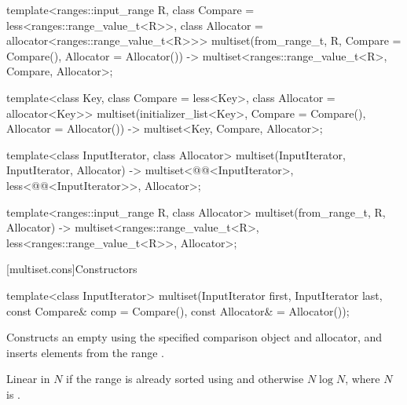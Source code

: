 \documentclass{wg21}
\begin{document}
\begin{addedblock}
\begin{codeblock}
template<ranges::input_range R, class Compare = less<ranges::range_value_t<R>>,
    class Allocator = allocator<ranges::range_value_t<R>>>
multiset(from_range_t, R, Compare = Compare(), Allocator = Allocator())
-> multiset<ranges::range_value_t<R>,  Compare, Allocator>;
\end{codeblock}
\end{addedblock}
\begin{codeblock}

template<class Key, class Compare = less<Key>, class Allocator = allocator<Key>>
multiset(initializer_list<Key>, Compare = Compare(), Allocator = Allocator())
-> multiset<Key, Compare, Allocator>;

template<class InputIterator, class Allocator>
multiset(InputIterator, InputIterator, Allocator)
-> multiset<@@<InputIterator>,
    less<@@<InputIterator>>, Allocator>;

\end{codeblock}
\begin{addedblock}
\begin{codeblock}
template<ranges::input_range R,  class Allocator>
multiset(from_range_t, R, Allocator)
-> multiset<ranges::range_value_t<R>,  less<ranges::range_value_t<R>>, Allocator>;
\end{codeblock}
\end{addedblock}
\begin{codeblock}

template<class Key, class Allocator>
multiset(initializer_list<Key>, Allocator) -> multiset<Key, less<Key>, Allocator>;
}
\end{codeblock}%

[multiset.cons]{Constructors}

%
\begin{itemdecl}
    template<class InputIterator>
    multiset(InputIterator first, InputIterator last,
    const Compare& comp = Compare(), const Allocator& = Allocator());
\end{itemdecl}

\begin{itemdescr}
    \pnum
    \effects
    Constructs an empty
    using the specified comparison object and allocator,
    and inserts elements from the range
    .

    \pnum
    \complexity
    Linear in $N$
    if the range
    is already sorted using  and otherwise $N \log N$,
    where $N$ is
    .
\end{itemdescr}
\end{document}
